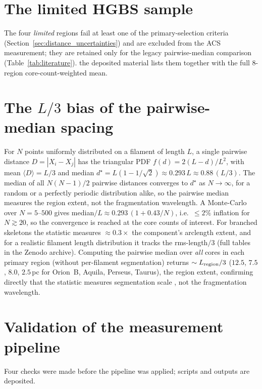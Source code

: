 \documentclass[usenatbib,twoside,twocolumn]{mnras}
\begin{document}

\appendix

\section{The limited HGBS sample}
\label{sec:limited_sample}
The four \emph{limited} regions fail at least one of the primary-selection criteria (Section~\ref{sec:distance_uncertainties}) and are excluded from the ACS measurement; they are retained only for the legacy pairwise-median comparison (Table~\ref{tab:literature}). the deposited material lists them together with the full 8-region core-count-weighted mean.



\section{The $L/3$ bias of the pairwise-median spacing}
\label{sec:pwmedian}
For $N$ points uniformly distributed on a filament of length $L$, a single pairwise distance $D=|X_i-X_j|$ has the triangular PDF $f(d)=2(L-d)/L^2$, with mean $\langle D\rangle=L/3$ and median $d^\star=L(1-1/\sqrt{2})\approx0.293\,L\approx0.88\,(L/3)$. The median of all $N(N-1)/2$ pairwise distances converges to $d^\star$ as $N\to\infty$, for a random or a perfectly periodic distribution alike, so the pairwise median measures the region extent, not the fragmentation wavelength. A Monte-Carlo over $N=5$--$500$ gives median$/L\approx0.293\,(1+0.43/N)$, i.e.\ $\le2\%$ inflation for $N\gtrsim20$, so the convergence is reached at the core counts of interest. For branched skeletons the statistic measures $\approx0.3\times$ the component's arclength extent, and for a realistic filament length distribution it tracks the rms-length$/3$ (full tables in the Zenodo archive). Computing the pairwise median over \emph{all} cores in each primary region (without per-filament segmentation) returns $\sim L_{\rm region}/3$ ($12.5$, $7.5$, $8.0$, $2.5$\,pc for Orion~B, Aquila, Perseus, Taurus), the region extent, confirming directly that the statistic measures segmentation scale , not the fragmentation wavelength.

\section{Validation of the measurement pipeline}
\label{sec:validation}

Four checks were made before the pipeline was applied; scripts and outputs are deposited.
\end{document}
